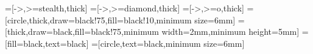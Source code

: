 
\usetikzlibrary{petri,arrows,shapes,backgrounds,automata,positioning,fit}
=[->,>=stealth,thick]
=[->,>=diamond,thick]
=[->,>=o,thick]
=[circle,thick,draw=black!75,fill=black!10,minimum size=6mm]
=[thick,draw=black,fill=black!75,minimum width=2mm,minimum height=5mm]
=[fill=black,text=black]
=[circle,text=black,minimum size=6mm]
\newcommand{\tzbox}[2]{\matrix(#1){#2\\}; }



